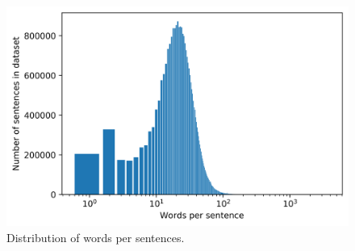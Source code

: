 \begin{figure}[h]
    \includegraphics[width=1\textwidth]{figures/charts/words_distribution.png}
    \caption{Distribution of words per sentences.}
    \label{figure:words_distribution}
\end{figure}

